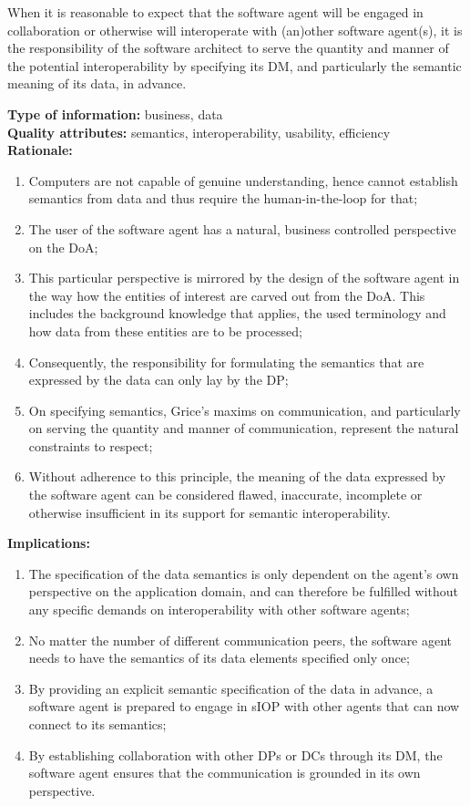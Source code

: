 \documentclass[sort&compress,preprint,authoryear,3p,twocolumn]{elsarticle}
\begin{document}
\begin{mmdp}\label{dp:rfsm}

When it is reasonable to expect that the software agent will be engaged in collaboration or otherwise will interoperate with (an)other software agent(s), it is the responsibility of the software architect to serve the quantity and manner of the potential interoperability by specifying its DM, and particularly the semantic meaning of its data, in advance. 

\textbf{Type of information:} business, data  \\
\textbf{Quality attributes:} semantics, interoperability, usability, efficiency   \\
\textbf{Rationale:}
\begin{enumerate}
  \item Computers are not capable of genuine understanding, hence cannot establish semantics from data and thus require the human-in-the-loop for that;
  \item The user of the software agent has a natural, business controlled perspective on the DoA;
  \item This particular perspective is mirrored by the design of the software agent in the way how the entities of interest are carved out from the DoA. This includes the background knowledge that applies, the used terminology and how data from these entities are to be processed;
  \item Consequently, the responsibility for formulating the semantics that are expressed by the data can only lay by the DP;
  \item On specifying semantics, Grice’s maxims on communication, and particularly on serving the quantity and manner of communication, represent the natural constraints to respect;
  \item Without adherence to this principle, the meaning of the data expressed by the software agent can be considered flawed, inaccurate, incomplete or otherwise insufficient in its support for semantic interoperability.
\end{enumerate}
\textbf{Implications:}
\begin{enumerate}
  \item The specification of the data semantics is only dependent on the agent’s own perspective on the application domain, and can therefore be fulfilled without any specific demands on interoperability with other software agents;
  \item No matter the number of different communication peers, the software agent needs to have the semantics of its data elements specified only once;
  \item By providing an explicit semantic specification of the data in advance, a software agent is prepared to engage in sIOP with other agents that can now connect to its semantics;
  \item By establishing collaboration with other DPs or DCs through its DM, the software agent ensures that the communication is grounded in its own perspective.
\end{enumerate}  
\end{mmdp}
\end{document}
